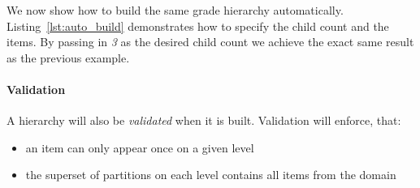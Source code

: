  We now show how to build the same grade hierarchy automatically. Listing~\ref{lst:auto_build} demonstrates how to specify the child count and the items. By passing in \textit{3} as the desired child count we achieve the exact same result as the previous example.



\paragraph{Validation} A hierarchy will also be \textit{validated} when it is built.
Validation will enforce, that:
\begin{itemize}
    \item an item can only appear once on a given level
    \item the superset of partitions on each level contains all items from the domain
\end{itemize}